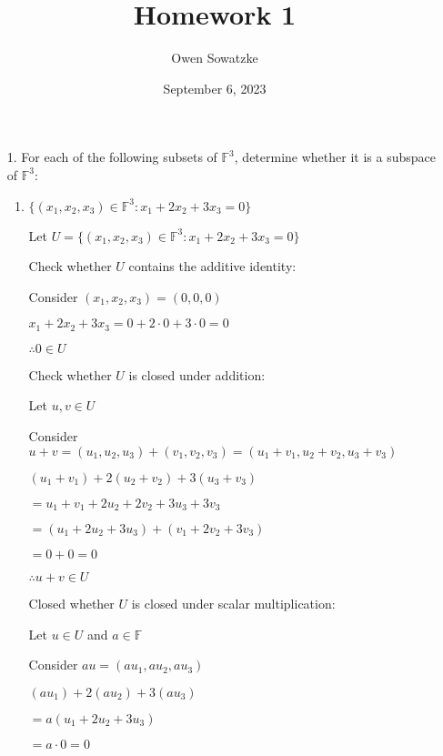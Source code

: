 \documentclass{article}
\title{Homework 1}
\author{Owen Sowatzke}
\date{September 6, 2023}
\begin{document}
	\setlength{\abovedisplayskip}{0pt}
	\setlength{\belowdisplayskip}{0pt}
		\setlength{\abovedisplayshortskip}{0pt}
	\setlength{\belowdisplayshortskip}{0pt}
	\doublespacing
	\maketitle
	
	\begin{enumerate}[nolistsep]
	
		\item[1.] For each of the following subsets of $\mathbb{F}^3$, determine whether it is a subspace of $\mathbb{F}^3$:
		
		\begin{enumerate}[nolistsep]
		
			\item ${\{(x_1, x_2, x_3) \in \mathbb{F}^3 : x_1 + 2x_2 + 3x_3 = 0 \}}$
			
			Let $U = {\{(x_1, x_2, x_3) \in \mathbb{F}^3 : x_1 + 2x_2 + 3x_3 = 0 \}}$
			
			Check whether $U$ contains the additive identity:
			
			Consider $(x_1, x_2, x_3) = (0, 0, 0)$
			
			$x_1 + 2x_2 + 3x_3 = 0 + 2 \cdot 0 + 3 \cdot 0 = 0$
			
			$\therefore 0 \in U$
			
			Check whether $U$ is closed under addition:
			
			Let $u,v \in U$
			
			Consider $u + v = (u_1, u_2, u_3) + (v_1, v_2, v_3) = (u_1 + v_1, u_2 + v_2, u_3 + v_3)$
			
			$(u_1 + v_1) + 2(u_2 + v_2) + 3(u_3 + v_3)$
			
			$ = u_1 + v_1 + 2u_2 + 2v_2 + 3u_3 + 3v_3$
			
			$ = (u_1 + 2u_2 + 3u_3) + (v_1 + 2v_2 + 3v_3)$
			
			$ = 0 + 0 = 0$
			
			$\therefore u + v \in U$
			
			Closed whether $U$ is closed under scalar multiplication:
			
			Let $u \in U$ and $a \in \mathbb{F}$
			
			Consider $au = (au_1, au_2, au_3)$
			
			$(au_1) + 2(au_2) + 3(au_3)$
			
			$ = a(u_1 + 2u_2 + 3u_3)$
			
			$ = a \cdot 0 = 0$
			

\end{enumerate}
\end{enumerate}
\end{document}
